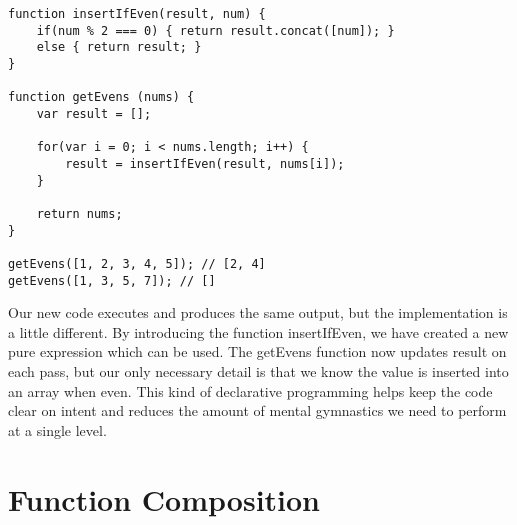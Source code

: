 \documentclass[a4paper,12pt,twoside]{book}
\begin{document}
\begin{lstlisting}
function insertIfEven(result, num) {
    if(num % 2 === 0) { return result.concat([num]); }
    else { return result; }
}

function getEvens (nums) {
    var result = [];
    
    for(var i = 0; i < nums.length; i++) {
        result = insertIfEven(result, nums[i]);    
    }
    
    return nums;
}

getEvens([1, 2, 3, 4, 5]); // [2, 4]
getEvens([1, 3, 5, 7]); // []
\end{lstlisting}

 Our new code executes and produces the same output, but the implementation is a little different. By introducing the function insertIfEven, we have created a new pure expression which can be used. The getEvens function now updates result on each pass, but our only necessary detail is that we know the value is inserted into an array when even. This kind of declarative programming helps keep the code clear on intent and reduces the amount of mental gymnastics we need to perform at a single level.

\section{Function Composition}
\end{document}
